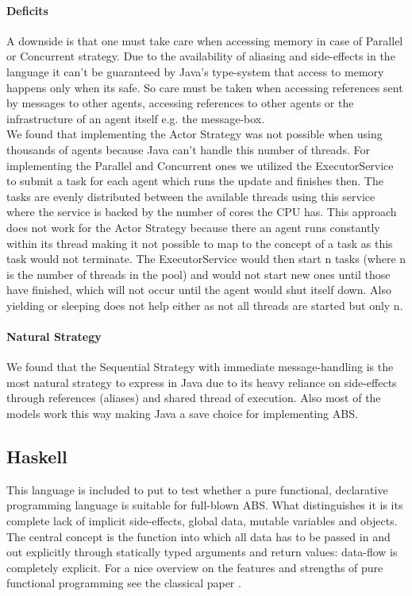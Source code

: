 \paragraph{Deficits}
A downside is that one must take care when accessing memory in case of Parallel or Concurrent strategy. Due to the availability of aliasing and side-effects in the language it can't be guaranteed by Java's type-system that access to memory happens only when its safe. So care must be taken when accessing references sent by messages to other agents, accessing references to other agents or the infrastructure of an agent itself e.g. the message-box. \\
We found that implementing the Actor Strategy was not possible when using thousands of agents because Java can't handle this number of threads. For implementing the Parallel and Concurrent ones we utilized the ExecutorService to submit a task for each agent which runs the update and finishes then. The tasks are evenly distributed between the available threads using this service where the service is backed by the number of cores the CPU has. This approach does not work for the Actor Strategy because there an agent runs constantly within its thread making it not possible to map to the concept of a task as this task would not terminate. The ExecutorService would then start n tasks (where n is the number of threads in the pool) and would not start new ones until those have finished, which will not occur until the agent would shut itself down. Also yielding or sleeping does not help either as not all threads are started but only n. 

\paragraph{Natural Strategy}
We found that the Sequential Strategy with immediate message-handling is the most natural strategy to express in Java due to its heavy reliance on side-effects through references (aliases) and shared thread of execution. Also most of the models work this way making Java a save choice for implementing ABS.





 
\subsection{Haskell}
This language is included to put to test whether a pure functional, declarative programming language is suitable for full-blown ABS. What distinguishes it is its complete lack of implicit side-effects, global data, mutable variables and objects. The central concept is the function into which all data has to be passed in and out explicitly through statically typed arguments and return values: data-flow is completely explicit. For a nice overview on the features and strengths of pure functional programming see the classical paper  \cite{hughes_why_1989}.

